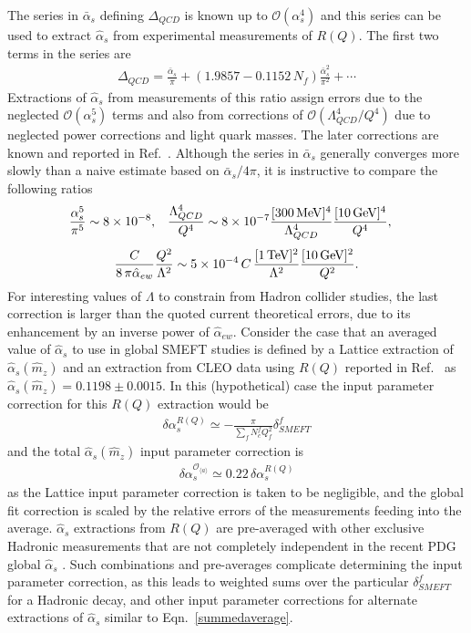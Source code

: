 \documentclass[twocolumn,nofootinbib,amsmath,amssymb,prl,aps,superscriptaddress,tightenlines,preprintnumbers]{revtex4}
\newcommand{\bea}{\begin{eqnarray}}
\newcommand{\eea}{\end{eqnarray}}
\begin{document}
The series in $\bar{\alpha}_s$ defining $\Delta_{QCD}$ is known up to $\mathcal{O}(\alpha_s^4)$ \cite{Baikov:2008jh,Baikov:2012zn}
and this series can be used to extract $\hat{\alpha}_s$ from experimental measurements of $R(Q)$.
The first two terms in the series are
\bea
\Delta_{QCD} = \frac{\bar{\alpha}_s}{\pi} + (1.9857 - 0.1152 \, N_f)\frac{\bar{\alpha}_s^2}{\pi^2} + \cdots
\eea
Extractions of $\hat{\alpha}_s$ from measurements of this ratio assign errors due to the neglected $\mathcal{O}(\alpha_s^5)$
terms and also from corrections of $\mathcal{O}(\Lambda_{QCD}^4/Q^4)$ due to neglected power corrections
and light quark masses. The later corrections are known and reported in Ref.~\cite{Kiyo:2009gb,Baikov:2012er,Chetyrkin:1996ela}.
Although the series in $\bar{\alpha}_s$ generally converges more slowly than a naive estimate
based on $\bar{\alpha}_s/4 \pi$, it is instructive to compare the following ratios
\begin{align*}
\frac{\alpha_s^5}{\pi^5} &\sim 8 \times 10^{-8}, &
\frac{\Lambda_{QCD}^4}{Q^4} &\sim 8 \times 10^{-7} \frac{[{\rm 300 \, {\rm MeV}}]^4}{\Lambda_{QCD}^4} \frac{[{\rm 10 \, {\rm GeV}}]^4}{Q^4},
\end{align*}
\begin{align*}
\frac{C}{8 \, \pi \hat{\alpha}_{ew}} \frac{Q^2}{\Lambda^2} \sim 5 \times 10^{-4} \, C \, \frac{[{\rm 1 \, TeV}]^2}{\Lambda^2}  \frac{[{\rm 10 \, {\rm GeV}}]^2}{Q^2}.
\end{align*}
For interesting values of $\Lambda$ to constrain from Hadron collider studies, the last correction is larger than
the quoted current theoretical errors, due to its enhancement by an inverse power of
$\hat{\alpha}_{ew}$. Consider the case that an averaged value of $\hat{\alpha}_{s}$ to use in global
SMEFT studies is defined by a Lattice extraction of $\hat{\alpha}_s(\hat{m}_z)$
and an extraction from CLEO data \cite{CLEO:2007suf} using $R(Q)$ reported in Ref.~\cite{Baikov:2008jh}
as $\hat{\alpha}_s(\hat{m}_z) = 0.1198 \pm 0.0015$.
In this (hypothetical) case the input parameter correction for this $R(Q)$
extraction would be
\bea
\delta \alpha^{R(Q)}_s \simeq - \frac{\pi}{\sum_f N_c^f Q_f^2} \delta^f_{SMEFT}
\eea
and the total $\hat{\alpha}_s(\hat{m}_z)$ input parameter correction is
\bea
\delta \alpha^{\mathcal{O}_{\langle a \rangle}}_s \simeq  0.22 \, \delta \alpha^{R(Q)}_s
\eea
as the Lattice input parameter correction is taken to be negligible, and the global
fit correction is scaled by the relative errors of the measurements feeding into the
average.  $\hat{\alpha}_s$ extractions from $R(Q)$ are pre-averaged
with other exclusive Hadronic
measurements that are not completely independent
in the recent PDG global $\hat{\alpha}_{s}$ \cite{Workman:2022ynf}. Such combinations and pre-averages
complicate determining the input parameter correction, as this leads to weighted sums over the
particular $\delta^f_{SMEFT}$ for a Hadronic decay, and other input parameter corrections
for alternate extractions of $\hat{\alpha}_{s}$ similar to Eqn.~\ref{summedaverage}.
\end{document}
